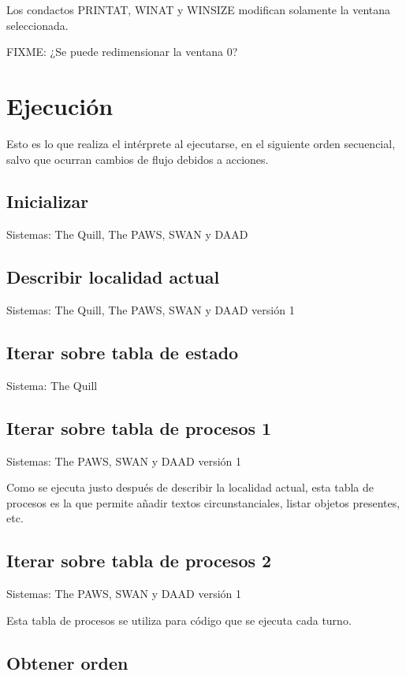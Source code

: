 \documentclass[11pt, a5paper]{article}
\newcommand{\quill}{\textsf{The Quill}\xspace}
\newcommand{\paw}{\textsf{The PAWS}\xspace}
\newcommand{\swan}{\textsf{SWAN}\xspace}
\newcommand{\daad}{\textsf{DAAD}\xspace}
\newcommand{\sistema}[1]{\noindent Sistema: #1 \nopagebreak}
\newcommand{\sistemas}[1]{\noindent Sistemas: #1 \nopagebreak}
\begin{document}
Los condactos PRINTAT, WINAT y WINSIZE modifican solamente la ventana seleccionada.

FIXME: ¿Se puede redimensionar la ventana 0?


\section{Ejecución}

Esto es lo que realiza el intérprete al ejecutarse, en el siguiente orden secuencial, salvo que ocurran cambios de flujo debidos a acciones.

\subsection{Inicializar}

\sistemas{\quill, \paw, \swan y \daad}

\subsection{Describir localidad actual}

\sistemas{\quill, \paw, \swan y \daad versión 1}

\subsection{Iterar sobre tabla de estado}

\sistema{\quill}

\subsection{Iterar sobre tabla de procesos 1}

\sistemas{\paw, \swan y \daad versión 1}

Como se ejecuta justo después de describir la localidad actual, esta tabla de procesos es la que permite añadir textos circunstanciales, listar objetos presentes, etc.

\subsection{Iterar sobre tabla de procesos 2}

\sistemas{\paw, \swan y \daad versión 1}

Esta tabla de procesos se utiliza para código que se ejecuta cada turno.

\subsection{Obtener orden}
\end{document}
